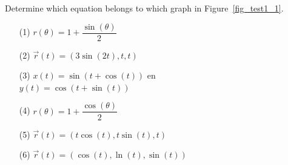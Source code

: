 \begin{Exercise} Determine which equation belongs to which graph in Figure~\ref{fig_test1_1}. 
\begin{multicols}{3}
\begin{enumerate}
\item[] 
\item[] 
\item[] 
\item[]
\item[(1)] $r(\theta)=1+\dfrac{\sin(\theta)}{2}$
\item[(2)] $\vec{r}(t)=\left(3 \sin(2 t), t, t\right)$
\item[(3)] $x(t)=\sin\left(t+\cos(t)\right)$ en\\ 
$y(t)=\cos\left(t+\sin(t)\right)$
\item[(4)] $r(\theta)=1+\dfrac{\cos(\theta)}{2}$
\item[(5)] $\vec{r}(t)=\left(t\cos( t), t\sin(t),t\right)$
\item[(6)] $\vec{r}(t)=\left(\cos( t), \ln(t), \sin(t)\right)$
\end{enumerate}
\EndCurrentQuestion
\end{multicols}
\begin{figure}[H]
\centering
\centerline{
\hspace*{0.5cm}
\hspace*{0.5cm}
}
\end{figure}
\end{Exercise}
